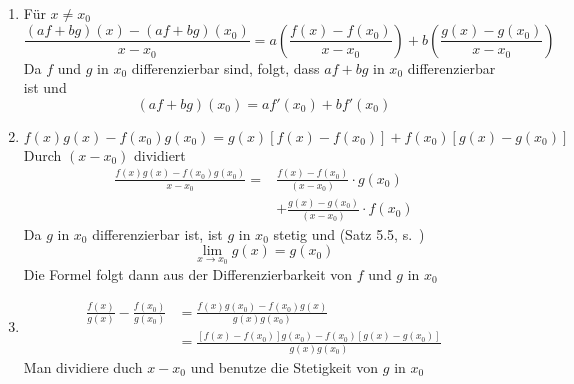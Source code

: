 \begin{beweis}{}
\begin{enumerate}
\item Für $x\not=x_0$
\[\frac{{\left( {af + bg} \right)\left( x \right) - \left( {af + bg} \right)\left( {{x_0}} \right)}}{{x - {x_0}}} = a\left( {\frac{{f\left( x \right) - f\left( {{x_0}} \right)}}{{x - {x_0}}}} \right) + b\left( {\frac{{g\left( x \right) - g\left( {{x_0}} \right)}}{{x - {x_0}}}} \right)\]
Da $f$ und $g$ in $x_0$ differenzierbar sind, folgt, dass $af+bg$ in $x_0$ differenzierbar ist und
\[\left( {af + bg} \right)\left( {{x_0}} \right) = af'\left( {{x_0}} \right) + bf'\left( {{x_0}} \right)\]
\item \[f\left( x \right)g\left( x \right) - f\left( {{x_0}} \right)g\left( {{x_0}} \right) = g\left( x \right)\left[ {f\left( x \right) - f\left( {{x_0}} \right)} \right] + f\left( {{x_0}} \right)\left[ {g\left( x \right) - g\left( {{x_0}} \right)} \right]\]
Durch $\left( x-x_0\right)$ dividiert
\begin{align*}
\frac{{f\left( x \right)g\left( x \right) - f\left( {{x_0}} \right)g\left( {{x_0}} \right)}}{{x - {x_0}}} =& \frac{{f\left( x \right) - f\left( {{x_0}} \right)}}{{\left( {x - {x_0}} \right)}} \cdot g\left( {{x_0}} \right)\\
 &+ \frac{{g\left( x \right) - g\left( {{x_0}} \right)}}{{\left( {x - {x_0}} \right)}} \cdot f\left( {{x_0}} \right)
\end{align*}
Da $g$ in $x_0$ differenzierbar ist, ist $g$ in $x_0$ stetig und (Satz 5.5, s.~\pageref{satz5.5})
\[\mathop {\lim }\limits_{x \to {x_0}} g\left( x \right) = g\left( {{x_0}} \right)\]
Die Formel folgt dann aus der Differenzierbarkeit von $f$ und $g$ in $x_0$
\item \begin{align*}
\frac{{f\left( x \right)}}{{g\left( x \right)}} - \frac{{f\left( {{x_0}} \right)}}{{g\left( {{x_0}} \right)}} &= \frac{{f\left( x \right)g\left( {{x_0}} \right) - f\left( {{x_0}} \right)g\left( x \right)}}{{g\left( x \right)g\left( {{x_0}} \right)}}\\
 &= \frac{{\left[ {f\left( x \right) - f\left( {{x_0}} \right)} \right]g\left( {{x_0}} \right) - f\left( {{x_0}} \right)\left[ {g\left( x \right) - g\left( {{x_0}} \right)} \right]}}{{g\left( x \right)g\left( {{x_0}} \right)}}
\end{align*}
Man dividiere duch $x-x_0$ und benutze die Stetigkeit von $g$ in $x_0$
\end{enumerate}
\end{beweis}
